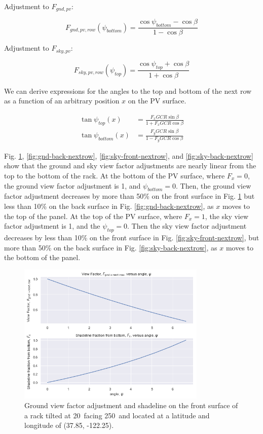 \documentclass[conference]{IEEEtran}
\begin{document}
Adjustment to $F_{gnd,pv}$:

\begin{equation}
F_{gnd,pv,row}\left(\psi_{bottom} \right) = \frac{\cos \psi_{bottom} - \cos \beta}{1-\cos\beta}
\end{equation}

Adjustment to $F_{sky,pv}$:

\begin{equation}
F_{sky,pv,row}\left(\psi_{top} \right) = \frac{\cos \psi_{top} + \cos \beta}{1+\cos\beta}
\end{equation}

We can derive expressions for the angles to the top and bottom of the next row as a function of an arbitrary position $x$ on the PV surface.

\begin{align}
\tan \psi_{top}\left(x \right) &= \frac{F_x GCR \sin \beta}{1 + F_x GCR \cos \beta}\\
\tan \psi_{bottom}\left(x \right) &= \frac{F_y GCR \sin \beta}{1 - F_y GCR \cos \beta}
\end{align}

Fig. \ref{fig:gnd-front-nextrow}, \ref{fig:gnd-back-nextrow}, \ref{fig:sky-front-nextrow}, and \ref{fig:sky-back-nextrow} show that the ground and sky view factor adjustments are nearly linear from the top to the bottom of the rack.  At the bottom of the PV surface, where $F_x=0$, the ground view factor adjustment is 1, and $\psi_{bottom}=0$.  Then, the ground view factor adjustment decreases by more than 50\% on the front surface in Fig. \ref{fig:gnd-front-nextrow} but less than 10\% on the back surface in Fig. \ref{fig:gnd-back-nextrow}, as $x$ moves to the top of the panel.  At the top of the PV surface, where $F_x=1$, the sky view factor adjustment is 1, and the $\psi_{top}=0$.  Then the sky view factor adjustment decreases by less than 10\% on the front surface in Fig. \ref{fig:sky-front-nextrow}, but more than 50\% on the back surface in Fig. \ref{fig:sky-back-nextrow}, as $x$ moves to the bottom of the panel.

\begin{figure}
\centering
\includegraphics[width=9cm]{ground_diffuse_front_w-next_row.png}
\caption{Ground view factor adjustment and shadeline on the front surface of a rack tilted at 20\degree\ facing 250\degree\ and located at a latitude and longitude of (37.85\degree, -122.25\degree).}
\label{fig:gnd-front-nextrow}
\end{figure}
\end{document}
